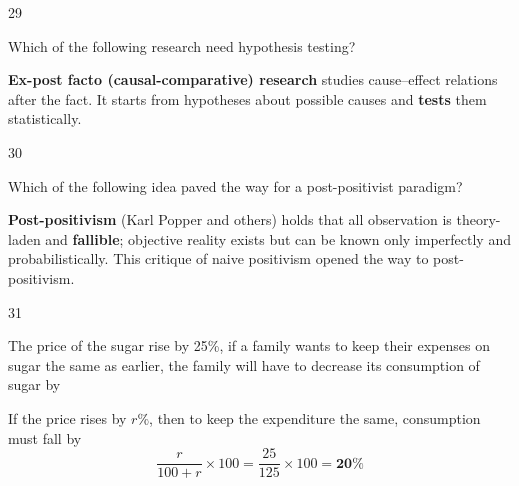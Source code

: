 \begin{question}{29}
{Which of the following research need hypothesis testing?\par}
\begin{explain}
\textbf{Ex-post facto (causal-comparative) research} studies cause--effect relations after the fact. It starts from hypotheses about possible causes and \textbf{tests} them statistically.
\end{explain}
\end{question}

\begin{question}{30}
{Which of the following idea paved the way for a post-positivist paradigm?\par}
\begin{explain}
\textbf{Post-positivism} (Karl Popper and others) holds that all observation is theory-laden and \textbf{fallible}; objective reality exists but can be known only imperfectly and probabilistically. This critique of naive positivism opened the way to post-positivism.
\end{explain}
\end{question}

\begin{question}{31}
{The price of the sugar rise by 25\%, if a family wants to keep their expenses on sugar the same as earlier, the family will have to decrease its consumption of sugar by\par}
\begin{explain}
If the price rises by $r\%$, then to keep the expenditure the same, consumption must fall by
\[\frac{r}{100+r}\times100=\frac{25}{125}\times100=\mathbf{20\%}\]
\end{explain}
\end{question}

